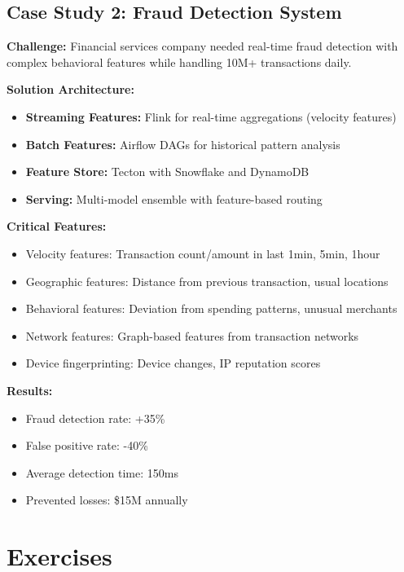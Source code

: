 \subsection{Case Study 2: Fraud Detection System}

\textbf{Challenge:} Financial services company needed real-time fraud detection with complex behavioral features while handling 10M+ transactions daily.

\textbf{Solution Architecture:}
\begin{itemize}
    \item \textbf{Streaming Features:} Flink for real-time aggregations (velocity features)
    \item \textbf{Batch Features:} Airflow DAGs for historical pattern analysis
    \item \textbf{Feature Store:} Tecton with Snowflake and DynamoDB
    \item \textbf{Serving:} Multi-model ensemble with feature-based routing
\end{itemize}

\textbf{Critical Features:}
\begin{itemize}
    \item Velocity features: Transaction count/amount in last 1min, 5min, 1hour
    \item Geographic features: Distance from previous transaction, usual locations
    \item Behavioral features: Deviation from spending patterns, unusual merchants
    \item Network features: Graph-based features from transaction networks
    \item Device fingerprinting: Device changes, IP reputation scores
\end{itemize}

\textbf{Results:}
\begin{itemize}
    \item Fraud detection rate: +35\%
    \item False positive rate: -40\%
    \item Average detection time: 150ms
    \item Prevented losses: \$15M annually
\end{itemize}

\section{Exercises}

